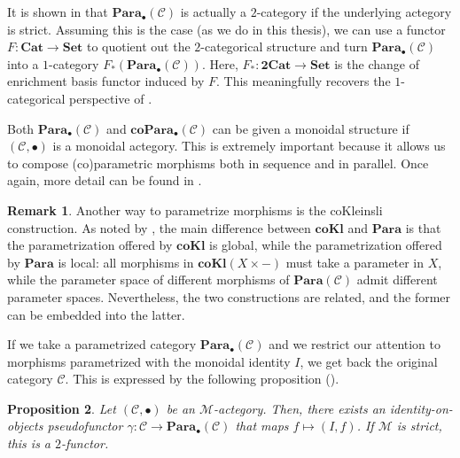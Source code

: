 \documentclass[12pt,a4paper,openright,twoside]{report}
\theoremstyle{plain}
\newtheorem{proposition}{Proposition}
\theoremstyle{definition}
\newtheorem{remark}[proposition]{Remark}
\begin{document}
It is shown in \cite{gavranovic2024fundamental} that $\mathbf{Para}_{\bullet}(\mathcal{C})$ is actually a $2$-category if the underlying actegory is strict. Assuming this is the case (as we do in this thesis), we can use a functor $F: \mathbf{Cat} \to \mathbf{Set}$ to quotient out the $2$-categorical structure and turn $\mathbf{Para}_{\bullet}(\mathcal{C})$ into a $1$-category $F_{*}(\mathbf{Para}_{\bullet}(\mathcal{C}))$. Here, $F_{*}: \mathbf{2Cat} \to \mathbf{Set}$ is the change of enrichment basis functor induced by $F$. This meaningfully recovers the $1$-categorical perspective of \cite{fong2019backprop}.


Both $\mathbf{Para}_{\bullet}(\mathcal{C})$ and $\mathbf{coPara}_{\bullet}(\mathcal{C})$ can be given a monoidal structure if $(\mathcal{C}, \bullet)$ is a monoidal actegory. This is extremely important because it allows us to compose (co)parametric morphisms both in sequence and in parallel. Once again, more detail can be found in \cite{gavranovic2024fundamental}.


\begin{remark}
  Another way to parametrize morphisms is the coKleinsli construction. As noted by \cite{gavranovic2024fundamental}, the main difference between $\mathbf{coKl}$ and $\mathbf{Para}$ is that the parametrization offered by $\mathbf{coKl}$ is global, while the parametrization offered by $\mathbf{Para}$ is local: all morphisms in $\mathbf{coKl}(X \times -)$ must take a parameter in $X$, while the parameter space of different morphisms of $\mathbf{Para}(\mathcal{C})$ admit different parameter spaces. Nevertheless, the two constructions are related, and the former can be embedded into the latter.
\end{remark}


If we take a parametrized category $\mathbf{Para}_\bullet(\mathcal{C})$ and we restrict our attention to morphisms parametrized with the monoidal identity $I$, we get back the original category $\mathcal{C}$. This is expressed by the following proposition (\cite{gavranovic2024fundamental}).

\begin{proposition}
  \label{prop: embeddingth}
  Let $(\mathcal{C}, \bullet)$ be an $\mathcal{M}$-actegory. Then, there exists an identity-on-objects pseudofunctor $\gamma: \mathcal{C} \to \mathbf{Para}_\bullet(\mathcal{C})$ that maps $f \mapsto (I,f)$. If $\mathcal{M}$ is strict, this is a $2$-functor.
\end{proposition}
\end{document}
